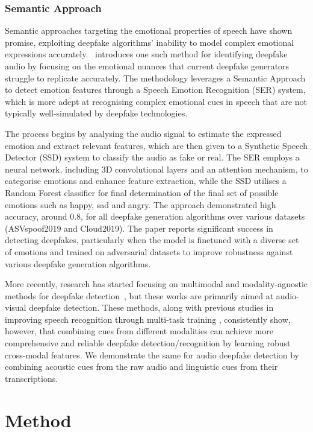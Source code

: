 \documentclass{Interspeech}
\begin{document}
\subsubsection{Semantic Approach}
Semantic approaches targeting the emotional properties of speech have shown
promise, exploiting deepfake algorithms' inability to model complex emotional
expressions accurately.~\cite{conti2022deepfake} introduces one such method for
identifying deepfake audio by focusing on the emotional nuances that current
deepfake generators struggle to replicate accurately. The methodology leverages
a Semantic Approach to detect emotion features through a Speech Emotion
Recognition (SER) system, which is more adept at recognising complex emotional
cues in speech that are not typically well-simulated by deepfake technologies.

The process begins by analysing the audio signal to estimate the expressed
emotion and extract relevant features, which are then given to a Synthetic
Speech Detector (SSD) system to classify the audio as fake or real. The SER
employs a neural network, including 3D convolutional layers and an attention
mechanism, to categorise emotions and enhance feature extraction, while the SSD
utilises a Random Forest classifier for final determination of the final set of
possible emotions such as happy, sad and angry. The approach demonstrated high
accuracy, around 0.8, for all deepfake generation algorithms over various
datasets (ASVspoof2019 and Cloud2019). The paper reports significant success in
detecting deepfakes, particularly when the model is finetuned with a diverse
set of emotions and trained on adversarial datasets to improve robustness
against various deepfake generation algorithms.

More recently, research has started focusing on multimodal and
modality-agnostic methods for deepfake detection~\cite{av_multimodal,
  multimodal_df_detection, modality_agnostic}, but these works are primarily
aimed at audio-visual deepfake detection. These methods, along with previous
studies in improving speech recognition through multi-task training
\cite{multitask_sr}, consistently show, however, that combining cues from
different modalities can achieve more comprehensive and reliable deepfake
detection/recognition by learning robust cross-modal features. We demonstrate
the same for audio deepfake detection by combining acoustic cues from the raw
audio and linguistic cues from their transcriptions.

\section{Method}
\label{sec:method}
\end{document}
